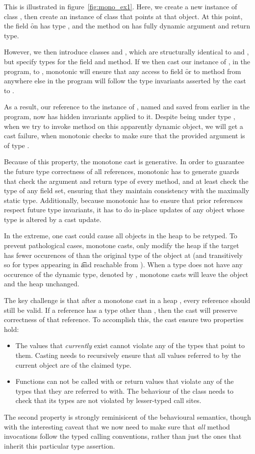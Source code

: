 \documentclass[a4paper,USenglish]{tex/lipics-v2016}
\begin{document}
This is illustrated in figure~\ref{fig:mono_ex1}. Here, we create a new 
instance of class \D, then create an instance of class \C that points at that
object. At this point, the field \f on \C has type \any, and the method \m
on \D has fully dynamic argument and return type.

However, we then introduce classes \E and , which are structurally 
identical to \C and \D, but specify types for the field and method. If we then
cast our instance of \C, \a in the program, to \C, monotonic will ensure that
any access to field \f or to method \m from anywhere else in the program will
follow the type invariants asserted by the cast to \E.

As a result, our reference to the instance of \D, named  and saved from
earlier in the program, now has hidden invariants applied to it. Despite being
under type \any, when we try to invoke method \m on this apparently dynamic 
object, we will get a cast failure, when monotonic checks to make sure that the
provided argument is of type \E. 

Because of this property, the monotone cast is generative. In order to guarantee
the future type correctness of all references, monotonic has to generate guards
that check the argument and return type of every method, and at least check the
type of any field set, ensuring that they maintain consistency with the 
maximally static type. Additionally, because monotonic has to ensure that 
prior references respect future type invariants, it has to do in-place updates
of any object whose type is altered by a cast update.

In the extreme, one cast could cause all objects in the heap to be
retyped. To prevent pathological cases, monotone casts, only modify the heap
if the target \C has fewer occurences of \any than the original type of the
object at \a (and transitively so for types appearing in \t and reachable
from \a).  When a type \C does not have any occurence of the dynamic type,
denoted by \statictype\C\K\V, monotone casts will leave the object and the
heap unchanged.

The key challenge is that after a monotone
cast in a heap \s, every reference should still be valid.  If a reference
has a type other than \any, then the cast will preserve correctness of that
reference. To accomplish this, the cast ensure two properties hold:
\begin{itemize}
\item The values that \emph{currently} exist cannot violate any of the types
  that point to them. Casting needs to recursively ensure that all values
  referred to by the current object are of the claimed type.
\item Functions can not be called with or return values that violate any of
  the types that they are referred to with. The behaviour of the class needs
  to check that its types are not violated by lesser-typed call sites.
\end{itemize}
The second property is strongly reminisicent of the behavioural semantics,
though with the interesting caveat that we now need to make sure that
\emph{all} method invocations follow the typed calling conventions, rather
than just the ones that inherit this particular type assertion.
\end{document}
